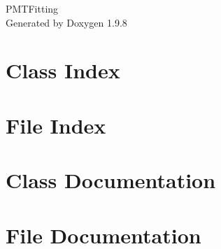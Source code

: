\documentclass[twoside]{book}
\newcommand{\+}{\discretionary{\mbox{\scriptsize$\hookleftarrow$}}{}{}}
\newcommand{\clearemptydoublepage}{%
    \newpage{\pagestyle{empty}\cleardoublepage}%
  }
\begin{document}
  \raggedbottom
    \hypersetup{pageanchor=false,
                bookmarksnumbered=true,
                pdfencoding=unicode
               }
  \begin{titlepage}
  \vspace*{7cm}
  \begin{center}%
  {\Large PMTFitting}\\
  \vspace*{1cm}
  {\large Generated by Doxygen 1.9.8}\\
  \end{center}
  \end{titlepage}
  \clearemptydoublepage
  \tableofcontents
  \clearemptydoublepage
  \hypersetup{pageanchor=true}



\chapter{Class Index}

\chapter{File Index}

\chapter{Class Documentation}


\chapter{File Documentation}






  \backmatter
  \newpage
  \clearemptydoublepage
  \printindex
\end{document}
